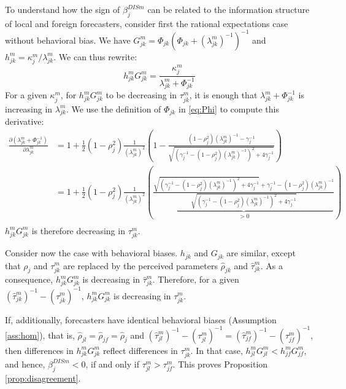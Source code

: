 To understand how the sign of $\beta^{DISm}_{j}$ can be related to the information structure of local and foreign forecasters, consider first the rational expectations case without behavioral bias. We have $G_{jk}^m=\Phi_{jk}(\Phi_{jk}+(\lambda_{jk}^m)^{-1})^{-1}$ and $h_{jk}^m=\kappa_j^m/\lambda_{jk}^m$. We can thus rewrite:
$$h_{jk}^mG_{jk}^m=\frac{\kappa_j^m}{\lambda_{jk}^m+\Phi_{jk}^{-1}}$$
For a given $\kappa_j^m$, for $h_{jk}^mG_{jk}^m$ to be decreasing in $\tau_{jk}^m$, it is enough that $\lambda_{jk}^m+\Phi_{jk}^{-1}$ is increasing in $\lambda_{jk}^m$. We use the definition of $\Phi_{jk}$ in \eqref{eq:Phi} to compute this derivative:
$$\begin{array}{ll}\frac{\partial(\lambda_{jk}^m+\Phi_{jk}^{-1})}{\partial\lambda_{jk}^m}&=1+\frac{1}{2}(1-\rho_j^2)\frac{1}{(\lambda_{jk}^m)^2}\left(1-\frac{(1-\rho_j^2)(\lambda_{jk}^m)^{-1}-\gamma_j^{-1}}{\sqrt{(\gamma_j^{-1}-(1-\rho_j^2)(\lambda_{jk}^m)^{-1})^2+4\gamma_j^{-1}}}\right)\\
&=1+\frac{1}{2}(1-\rho_j^2)\frac{1}{(\lambda_{jk}^m)^2}\left(\underbrace{\frac{\sqrt{(\gamma_j^{-1}-(1-\rho_j^2)(\lambda_{jk}^m)^{-1})^2+4\gamma_j^{-1}}+\gamma_j^{-1}-(1-\rho_j^2)(\lambda_{jk}^m)^{-1}}{\sqrt{(\gamma_j^{-1}-(1-\rho_j^2)(\lambda_{jk}^m)^{-1})^2+4\gamma_j^{-1}}}}_{>0}\right)\\
\end{array}$$
$h_{jk}^mG_{jk}^m$ is therefore decreasing in $\tau_{jk}^m$.

Consider now the case with behavioral biases. $h_{jk}$ and $G_{jk}$ are similar, except that $\rho_{j}$ and $\tau_{jk}^m$ are replaced by the perceived parameters $\hat\rho_{jk}$ and $\hat\tau_{jk}^m$. As a consequence, $h_{jk}^mG_{jk}^m$ is decreasing in $\hat\tau_{jk}^m$. Therefore, for a given $(\hat\tau_{jk}^m)^{-1}-(\tau_{jk}^m)^{-1}$, $h_{jk}^mG_{jk}^m$ is decreasing in $\tau_{jk}^m$.

If, additionally, forecasters have identical behavioral biases (Assumption \ref{ass:hom}), that is, $\hat\rho_{jl}=\hat\rho_{jf}=\hat\rho_j$ and $(\hat\tau_{jl}^m)^{-1}-(\tau_{jl}^m)^{-1}=(\hat\tau_{jf}^m)^{-1}-(\tau_{jf}^m)^{-1}$, then differences in $h_{jk}^mG_{jk}^m$ reflect differences in $\tau_{jk}^m$. In that case, $h_{jl}^mG_{jl}^m<h_{jf}^mG_{jf}^m$, and hence, $\beta^{DISm}_{j}<0$, if and only if $\tau_{jl}^m>\tau_{jf}^m$. This proves Proposition \ref{prop:disagreement}.

